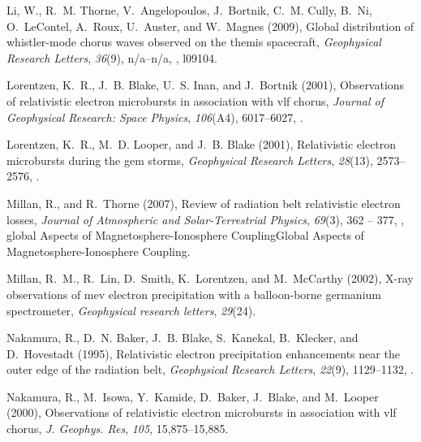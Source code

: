 \documentclass[draft, linenumbers]{agujournal}
\begin{document}
\begin{thebibliography}{35}
Li, W., R.~M. Thorne, V.~Angelopoulos, J.~Bortnik, C.~M. Cully, B.~Ni,
  O.~LeContel, A.~Roux, U.~Auster, and W.~Magnes (2009), Global distribution of
  whistler-mode chorus waves observed on the themis spacecraft,
  \textit{Geophysical Research Letters}, \textit{36}(9), n/a--n/a,
  , l09104.

Lorentzen, K.~R., J.~B. Blake, U.~S. Inan, and J.~Bortnik (2001{}),
  Observations of relativistic electron microbursts in association with vlf
  chorus, \textit{Journal of Geophysical Research: Space Physics},
  \textit{106}(A4), 6017--6027, .

Lorentzen, K.~R., M.~D. Looper, and J.~B. Blake (2001{}),
  Relativistic electron microbursts during the gem storms, \textit{Geophysical
  Research Letters}, \textit{28}(13), 2573--2576, .

Millan, R., and R.~Thorne (2007), Review of radiation belt relativistic
  electron losses, \textit{Journal of Atmospheric and Solar-Terrestrial
  Physics}, \textit{69}(3), 362 -- 377,
  , global Aspects of
  Magnetosphere-Ionosphere CouplingGlobal Aspects of Magnetosphere-Ionosphere
  Coupling.

Millan, R.~M., R.~Lin, D.~Smith, K.~Lorentzen, and M.~McCarthy (2002), X-ray
  observations of mev electron precipitation with a balloon-borne germanium
  spectrometer, \textit{Geophysical research letters}, \textit{29}(24).

Nakamura, R., D.~N. Baker, J.~B. Blake, S.~Kanekal, B.~Klecker, and
  D.~Hovestadt (1995), Relativistic electron precipitation enhancements near
  the outer edge of the radiation belt, \textit{Geophysical Research Letters},
  \textit{22}(9), 1129--1132, .

Nakamura, R., M.~Isowa, Y.~Kamide, D.~Baker, J.~Blake, and M.~Looper (2000),
  Observations of relativistic electron microbursts in association with vlf
  chorus, \textit{J. Geophys. Res}, \textit{105}, 15,875--15,885.


\end{thebibliography}
\end{document}
